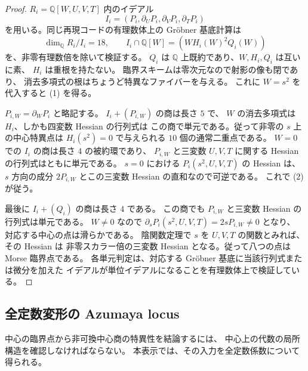 \begin{proof}
$R_i=\mathbb Q[W,U,V,T]$ 内のイデアル
\[
 I_i=(P_i,\partial_UP_i,\partial_VP_i,\partial_TP_i)
\]
を用いる。同じ再現コードの有理数体上の Gr\"obner 基底計算は
\begin{equation}
 \dim_{\mathbb Q}R_i/I_i=18,\qquad
 I_i\cap\mathbb Q[W]=(W H_i(W)^2Q_i(W))
 \label{cmo:eq:center-critical-elimination}
\end{equation}
を、非零有理数倍を除いて検証する。
$Q_i$ は $\mathbb Q$ 上既約であり、$W,H_i,Q_i$ は互いに素、
$H_i$ は重根を持たない。
臨界スキームは零次元なので射影の像も閉であり、
消去多項式の根はちょうど特異なファイバーを与える。
これに $W=s^2$ を代入すると (1) を得る。

$P_{i,W}=\partial_WP_i$ と略記する。
$I_i+(P_{i,W})$ の商は長さ $5$ で、
$W$ の消去多項式は $H_i$、しかも四変数 Hessian の行列式は
この商で単元である。従って非零の $s$ 上の中心特異点は
$H_i(s^2)=0$ で与えられる $10$ 個の通常二重点である。
$W=0$ での $I_i$ の商は長さ $4$ の被約環であり、
$P_{i,W}$ と三変数 $U,V,T$ に関する Hessian の行列式はともに単元である。
$s=0$ における $P_i(s^2,U,V,T)$ の Hessian は、
$s$ 方向の成分 $2P_{i,W}$ とこの三変数 Hessian の直和なので可逆である。
これで (2) が従う。

最後に $I_i+(Q_i)$ の商は長さ $4$ である。
この商でも $P_{i,W}$ と三変数 Hessian の行列式は単元である。
$W\ne0$ なので $\partial_sP_i(s^2,U,V,T)=2sP_{i,W}\ne0$ となり、
対応する中心の点は滑らかである。
陰関数定理で $s$ を $U,V,T$ の関数とみれば、その Hessian は
非零スカラー倍の三変数 Hessian となる。従って八つの点は Morse 臨界点である。
各単元判定は、対応する Gr\"obner 基底に当該行列式または微分を加えた
イデアルが単位イデアルになることを有理数体上で検証している。
\end{proof}


\subsection{全定数変形の Azumaya locus}

中心の臨界点から非可換中心商の特異性を結論するには、
中心上の代数の局所構造を確認しなければならない。
本表示では、その入力を全定数係数について得られる。

